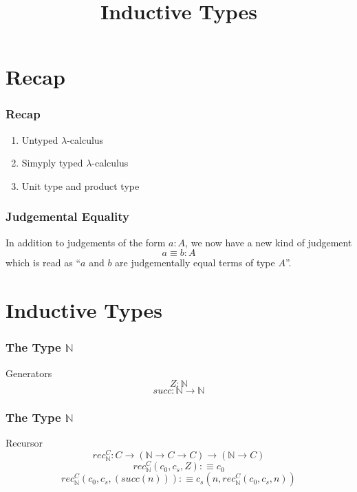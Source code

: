 \documentclass[14pt,compress]{beamer}
\title{Inductive Types}
\date{}
\newcommand{\N}{\mathbb{N}}
\begin{document}
\begin{frame}\label{frame : titlepage}
\titlepage
\end{frame}

\section{Recap}
\begin{frame}\label{frame : recap}
\frametitle{Recap}
\begin{enumerate}
\item Untyped \textcolor{beamer@mathtext}{$\lambda$}-calculus
\item Simyply typed \textcolor{beamer@mathtext}{$\lambda$}-calculus
\item Unit type and product type
\end{enumerate}
\end{frame}

\begin{frame}\label{frame : judgemental equality}
\frametitle{Judgemental Equality}

In addition to judgements of the form \textcolor{beamer@mathtext}{$a : A$},
we now have a new kind of judgement
\textcolor{beamer@mathtext}{
\[ a \equiv b : A \]}
\noindent which is read as
\textcolor{beamer@mathtext}{``$a$ and $b$ are judgementally equal terms of type $A$''}.

\end{frame}

\section{Inductive Types}
\begin{frame}\label{frame : gen of Nat}
\frametitle{The Type $\mathbb{N}$}


\begin{block}{Generators}
\textcolor{beamer@mathtext}{
\[ Z : \N \]
\[ succ : \N \to \N \]}
\end{block}
\end{frame}

\begin{frame}\label{frame : rec of Nat}
\frametitle{The Type $\mathbb{N}$}

\begin{block}{Recursor}
\textcolor{beamer@mathtext}{
\[ rec_{\N}^C : C \to (\N \to C \to C) \to (\N \to C) \]
\[ rec_{\N}^C (c_0,c_s,Z) :\equiv c_0 \]
\[ rec_{\N}^C (c_0,c_s,(succ(n))) :\equiv c_s(n, rec_{\N}^C(c_0,c_s,n)) \]}
\end{block}
\end{frame}
\end{document}
